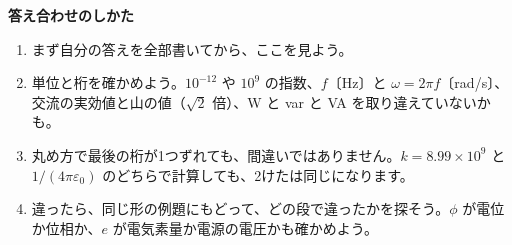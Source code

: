 \makeatletter
\def\phbkhead#1{\par\addvspace{4mm}\Needspace{6\baselineskip}\noindent{\sffamily\bfseries\large\color{bkDeep}#1}\par\nobreak\vspace{2mm}}
\newcommand\phyk{〔要確認〕}
\bkAnswerPages
\par\vspace{4mm}
\begin{tcolorbox}[bk base, unbreakable, colframe=bkTheme!60, colback=bkTheme!5, boxrule=0.8pt, arc=2mm, left=4mm, right=4mm, top=2mm, bottom=2mm]
{\sffamily\bfseries\color{bkDeep}答え合わせのしかた}\par\vspace{1mm}
\begin{enumerate}[label={\bkcircled{\arabic*}}, leftmargin=2.4\zw, itemsep=0pt, topsep=0pt]
\item まず自分の答えを全部書いてから、ここを見よう。
\item 単位と桁を確かめよう。$10^{-12}$ や $10^{9}$ の指数、$f$〔Hz〕と $\omega=2\pi f$〔rad/s〕、交流の実効値と山の値（$\sqrt2$ 倍）、W と var と VA を取り違えていないかも。
\item 丸め方で最後の桁が1つずれても、間違いではありません。$k=8.99\times10^9$ と $1/(4\pi\varepsilon_0)$ のどちらで計算しても、2けたは同じになります。
\item 違ったら、同じ形の例題にもどって、どの段で違ったかを探そう。$\phi$ が電位か位相か、$e$ が電気素量か電源の電圧かも確かめよう。
\end{enumerate}
\end{tcolorbox}

